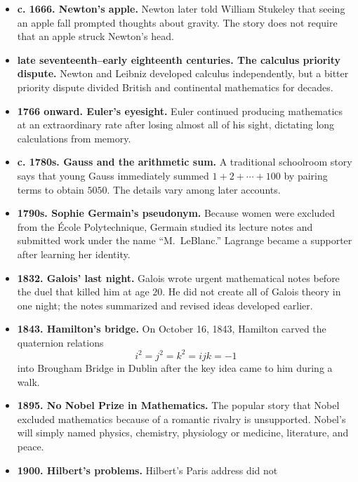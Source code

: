 \begin{itemize}
        \item \textbf{c. 1666. Newton's apple.} Newton later told William Stukeley that
              seeing an apple fall prompted thoughts about gravity. The story
              does not require that an apple struck Newton's head.
        \item \textbf{late seventeenth--early eighteenth centuries. The calculus
              priority dispute.} Newton and Leibniz
              developed calculus independently, but a bitter priority dispute
              divided British and continental mathematics for decades.
        \item \textbf{1766 onward. Euler's eyesight.} Euler continued producing mathematics
              at an extraordinary rate after losing almost all of his sight,
              dictating long calculations from memory.
        \item \textbf{c. 1780s. Gauss and the arithmetic sum.} A traditional schoolroom
              story says that young Gauss immediately summed
              $1+2+\cdots+100$ by pairing terms to obtain $5050$. The details
              vary among later accounts.
        \item \textbf{1790s. Sophie Germain's pseudonym.} Because women were excluded
              from the École Polytechnique, Germain studied its lecture notes
              and submitted work under the name ``M.\ LeBlanc.'' Lagrange
              became a supporter after learning her identity.
        \item \textbf{1832. Galois' last night.} Galois wrote urgent mathematical
              notes before the duel that killed him at age $20$. He did not
              create all of Galois theory in one night; the notes summarized
              and revised ideas developed earlier.
        \item \textbf{1843. Hamilton's bridge.} On October 16, 1843, Hamilton carved
              the quaternion relations
              \[
                  i^2=j^2=k^2=ijk=-1
              \]
              into Brougham Bridge in Dublin after the key idea came to him
              during a walk.
        \item \textbf{1895. No Nobel Prize in Mathematics.} The popular story
              that Nobel excluded mathematics because of a romantic rivalry is
              unsupported. Nobel's will simply named physics, chemistry,
              physiology or medicine, literature, and peace.
        \item \textbf{1900. Hilbert's problems.} Hilbert's Paris address did not

\end{itemize}
